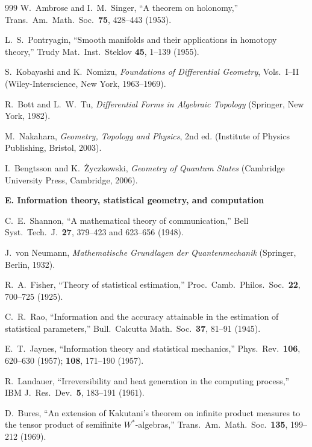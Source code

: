 \documentclass[11pt,a4paper,twoside]{book}
\theoremstyle{definition}
\begin{document}
\begin{thebibliography}{999}
W.~Ambrose and I.~M.~Singer,
``A theorem on holonomy,''
Trans.\ Am.\ Math.\ Soc.\ \textbf{75}, 428--443 (1953).

L.~S.~Pontryagin,
``Smooth manifolds and their applications in homotopy theory,''
Trudy Mat.\ Inst.\ Steklov \textbf{45}, 1--139 (1955).

S.~Kobayashi and K.~Nomizu,
\emph{Foundations of Differential Geometry}, Vols.~I--II
(Wiley-Interscience, New York, 1963--1969).

R.~Bott and L.~W.~Tu,
\emph{Differential Forms in Algebraic Topology}
(Springer, New York, 1982).

M.~Nakahara,
\emph{Geometry, Topology and Physics}, 2nd ed.
(Institute of Physics Publishing, Bristol, 2003).

I.~Bengtsson and K.~\.{Z}yczkowski,
\emph{Geometry of Quantum States}
(Cambridge University Press, Cambridge, 2006).

\item[]\textbf{E. Information theory, statistical geometry, and computation}

C.~E.~Shannon,
``A mathematical theory of communication,''
Bell Syst.\ Tech.\ J.\ \textbf{27}, 379--423 and 623--656 (1948).

J.~von Neumann,
\emph{Mathematische Grundlagen der Quantenmechanik}
(Springer, Berlin, 1932).

R.~A.~Fisher,
``Theory of statistical estimation,''
Proc.\ Camb.\ Philos.\ Soc.\ \textbf{22}, 700--725 (1925).

C.~R.~Rao,
``Information and the accuracy attainable in the estimation of statistical
parameters,'' Bull.\ Calcutta Math.\ Soc.\ \textbf{37}, 81--91 (1945).

E.~T.~Jaynes,
``Information theory and statistical mechanics,''
Phys.\ Rev.\ \textbf{106}, 620--630 (1957); \textbf{108}, 171--190 (1957).

R.~Landauer,
``Irreversibility and heat generation in the computing process,''
IBM J.\ Res.\ Dev.\ \textbf{5}, 183--191 (1961).

D.~Bures,
``An extension of Kakutani's theorem on infinite product measures to the
tensor product of semifinite $W^*$-algebras,''
Trans.\ Am.\ Math.\ Soc.\ \textbf{135}, 199--212 (1969).


\end{thebibliography}
\end{document}

